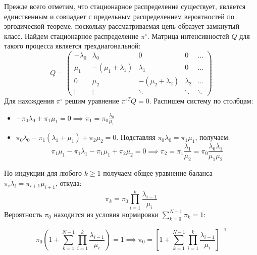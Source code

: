 \begin{eproof}
    Прежде всего отметим, что стационарное распределение существует, является единственным и совпадает с предельным распределением вероятностей по эргодической теореме, поскольку рассматриваемая цепь образует замкнутый класс. Найдем стационарное распределение $\pi^\circ$. Матрица интенсивностей $Q$ для такого процесса является трехдиагональной:
    \begin{equation}
        Q = \begin{pmatrix}
        -\lambda_0 & \lambda_0 & 0 & 0 & \dots \\
        \mu_1 & -(\mu_1 + \lambda_1) & \lambda_1 & 0 & \dots \\
        0 & \mu_2 & -(\mu_2 + \lambda_2) & \lambda_2 & \dots \\
        \vdots & \vdots & \ddots & \ddots & \ddots
        \end{pmatrix}
    \end{equation}
    Для нахождения $\pi^\circ$ решим уравнение $\pi^{\circ T} Q = 0$. Распишем систему по столбцам:
    \begin{itemize}
        \item[1)] $-\pi_0 \lambda_0 + \pi_1 \mu_1 = 0 \implies \pi_1 = \pi_0 \frac{\lambda_0}{\mu_1}$
        \item[2)] $\pi_0 \lambda_0 - \pi_1 (\lambda_1 + \mu_1) + \pi_2 \mu_2 = 0$. Подставляя $\pi_0 \lambda_0 = \pi_1 \mu_1$, получаем:
        \begin{equation}
            \pi_1 \mu_1 - \pi_1 \lambda_1 - \pi_1 \mu_1 + \pi_2 \mu_2 = 0 \implies \pi_2 = \pi_1 \frac{\lambda_1}{\mu_2} = \pi_0 \frac{\lambda_0 \lambda_1}{\mu_1 \mu_2}
        \end{equation}
    \end{itemize}
    По индукции для любого $k \ge 1$ получаем общее уравнение баланса $\pi_i \lambda_i = \pi_{i+1} \mu_{i+1}$, откуда:
    \begin{equation}
        \pi_k = \pi_0 \prod_{i=1}^k \frac{\lambda_{i-1}}{\mu_i}
    \end{equation}
    Вероятность $\pi_0$ находится из условия нормировки $\sum_{k=0}^{N-1} \pi_k = 1$:

    \pagebreak

    \begin{equation}
        \pi_0 \left( 1 + \sum_{k=1}^{N-1} \prod_{i=1}^k \frac{\lambda_{i-1}}{\mu_i} \right) = 1 \implies \pi_0 = \left[ 1 + \sum_{k=1}^{N-1} \prod_{i=1}^k \frac{\lambda_{i-1}}{\mu_i} \right]^{-1}
    \end{equation}

\end{eproof}

